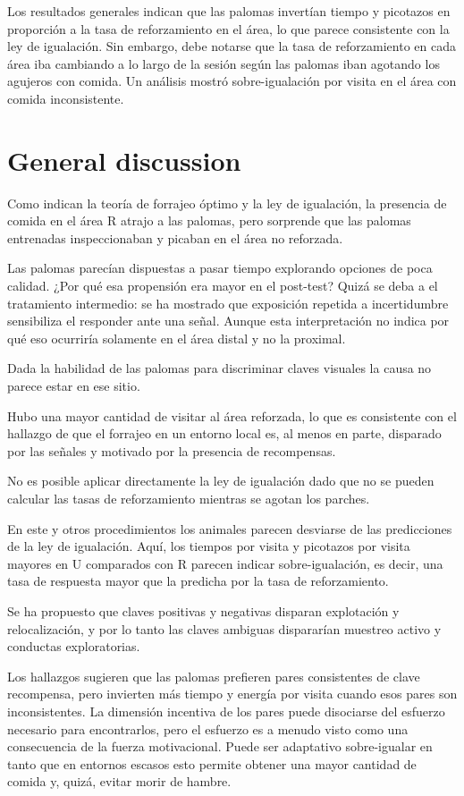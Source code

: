 \documentclass[a4paper,12pt]{article}
\begin{document}
Los resultados generales indican que las palomas invertían tiempo y picotazos en proporción a la tasa de reforzamiento en el área, lo que parece consistente con la ley de igualación. Sin embargo, debe notarse que la tasa de reforzamiento en cada área iba cambiando a lo largo de la sesión según las palomas iban agotando los agujeros con comida. Un análisis mostró sobre-igualación por visita en el área con comida inconsistente.

\section{General discussion}

Como indican la teoría de forrajeo óptimo y la ley de igualación, la presencia de comida en el área R atrajo a las palomas, pero sorprende que las palomas entrenadas inspeccionaban y picaban en el área no reforzada.

Las palomas parecían dispuestas a pasar tiempo explorando opciones de poca calidad. ¿Por qué esa propensión era mayor en el post-test? Quizá se deba a el tratamiento intermedio: se ha mostrado que exposición repetida a incertidumbre sensibiliza el responder ante una señal. Aunque esta interpretación no indica por qué eso ocurriría solamente en el área distal y no la proximal.

Dada la habilidad de las palomas para discriminar claves visuales la causa no parece estar en ese sitio.

Hubo una mayor cantidad de visitar al área reforzada, lo que es consistente con el hallazgo de que el forrajeo en un entorno local es, al menos en parte, disparado por las señales y motivado por la presencia de recompensas.

No es posible aplicar directamente la ley de igualación dado que no se pueden calcular las tasas de reforzamiento mientras se agotan los parches.

En este y otros procedimientos los animales parecen desviarse de las predicciones de la ley de igualación. Aquí, los tiempos por visita y picotazos por visita mayores en U comparados con R parecen indicar sobre-igualación, es decir, una tasa de respuesta mayor que la predicha por la tasa de reforzamiento.

Se ha propuesto que claves positivas y negativas disparan explotación y relocalización, y por lo tanto las claves ambiguas dispararían muestreo activo y conductas exploratorias.

Los hallazgos sugieren que las palomas prefieren pares consistentes de clave recompensa, pero invierten más tiempo y energía por visita cuando esos pares son inconsistentes. La dimensión incentiva de los pares puede disociarse del esfuerzo necesario para encontrarlos, pero el esfuerzo es a menudo visto como una consecuencia de la fuerza motivacional. Puede ser adaptativo sobre-igualar en tanto que en entornos escasos esto permite obtener una mayor cantidad de comida y, quizá, evitar morir de hambre.
\end{document}
